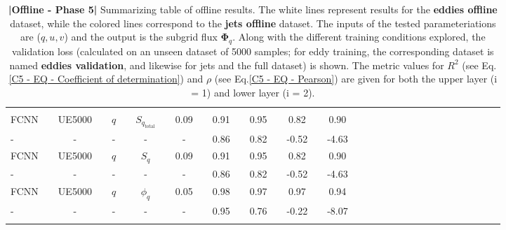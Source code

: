 \begin{table}[H]
\begin{tabular}{llclclclclclclclclclclclclclclcl}
\hline \\[-1.4em]
FCNN        &  & UE5000          &  & $q$       &   & $S_{q_{\text{total}}}$     &  & 0.09      &  & 0.91       &  & 0.95     &  & 0.82      &  & 0.90         \\ \rowcolor{Blue}
-     		&  & -               &  & -         &   &  -                                       &  &  -           &  & 0.86      &  & 0.82     &  & -0.52     &  & -4.63        \\ 
FCNN        &  & UE5000          &  & $q$       &   & $S_q$                               &  & 0.09      &  & 0.91       &  & 0.95     &  & 0.82      &  & 0.90             \\ \rowcolor{Blue}
-     		&  & -               &  & -         &   &  -                                       &  &  -           &  & 0.86      &  & 0.82      &  & -0.52    &  & -4.63          \\ 
FCNN        &  & UE5000          &  & $q$       &   & $\phi_q $                          &  & 0.05      &  & 0.98      &  & 0.97      &  & 0.97      &  & 0.94             \\ \rowcolor{Blue}
-     		&  & -               &  & -         &   &  -                                         &  &  -           &  & 0.95      &  & 0.76      &  & -0.22    &  & -8.07             \\ [0.4em]
\Xhline{1.5pt}\\[-0.8em]      
\end{tabular}
\caption{\textbf{|}\textcolor{section_color}{\textbf{Offline - Phase 5}}\textbf{|} Summarizing table of offline results. The white lines represent results for the \textbf{eddies offline} dataset, while the colored lines correspond to the \textbf{jets offline} dataset. The inputs of the tested parameteriations are ($q, u, v$) and the output is the subgrid flux $\mathbf{\Phi}_q$. Along with the different training conditions explored, the validation loss (calculated on an unseen dataset of 5000 samples; for eddy training, the corresponding dataset is named \textbf{eddies validation}, and likewise for jets and the full dataset) is shown. The metric values for $R^2$ (see Eq.\ref{C5 - EQ - Coefficient of determination}) and $\rho$ (see Eq.\ref{C5 - EQ - Pearson}) are given for both the upper layer (i = 1) and lower layer (i = 2).}
\label{C5 - TAB - PHASE 5}
\end{table}
\bgroup
